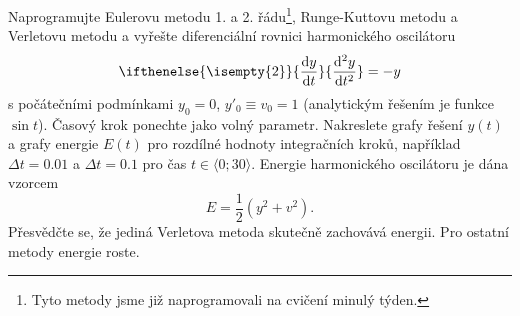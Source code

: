 \documentclass[a4paper,11pt,twoside]{article}
\renewcommand{\d}{\mathrm{d}}
\newcommand{\derivative}[3][]{\ifthenelse{\isempty{#1}}	    %
	{\frac{\d{#2}}{\d{#3}}}
	{\frac{\d^{#1}{#2}}{\d{#3}^{#1}}}
}
\begin{document}
    \begin{task}
        Naprogramujte Eulerovu metodu 1. a 2. řádu\footnote{Tyto metody jsme již naprogramovali na cvičení minulý týden.}, Runge-Kuttovu metodu a Verletovu metodu a vyřešte diferenciální rovnici harmonického oscilátoru
        \begin{equation}\label{eq:HO}
            \derivative[2]{y}{t}=-y
        \end{equation}
        s počátečními podmínkami $y_{0}=0$, $y'_{0}\equiv v_{0}=1$ (analytickým řešením je funkce $\sin t$).
        Časový krok ponechte jako volný parametr.
        Nakreslete grafy řešení $y(t)$ a grafy energie $E(t)$ pro rozdílné hodnoty integračních kroků, například $\Delta t=0.01$ a $\Delta t=0.1$ pro čas $t\in\langle0;30\rangle$.
        Energie harmonického oscilátoru je dána vzorcem
        \begin{equation}\label{eq:HOE}
            E=\frac{1}{2}\left(y^{2}+v^{2}\right).
        \end{equation}
        Přesvědčte se, že jediná Verletova metoda skutečně zachovává energii. 
        Pro ostatní metody energie roste.
    \end{task}
\end{document}
